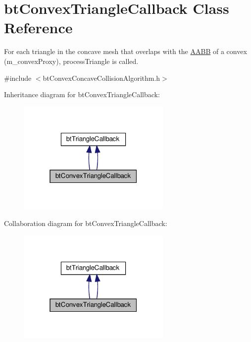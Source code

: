 \hypertarget{classbtConvexTriangleCallback}{}\section{bt\+Convex\+Triangle\+Callback Class Reference}
\label{classbtConvexTriangleCallback}


For each triangle in the concave mesh that overlaps with the \hyperlink{classAABB}{A\+A\+BB} of a convex (m\+\_\+convex\+Proxy), process\+Triangle is called.  




{\ttfamily \#include $<$bt\+Convex\+Concave\+Collision\+Algorithm.\+h$>$}



Inheritance diagram for bt\+Convex\+Triangle\+Callback\+:
\nopagebreak
\begin{figure}[H]
\begin{center}
\leavevmode
\includegraphics[width=211pt]{classbtConvexTriangleCallback__inherit__graph}
\end{center}
\end{figure}


Collaboration diagram for bt\+Convex\+Triangle\+Callback\+:
\nopagebreak
\begin{figure}[H]
\begin{center}
\leavevmode
\includegraphics[width=211pt]{classbtConvexTriangleCallback__coll__graph}
\end{center}
\end{figure}
